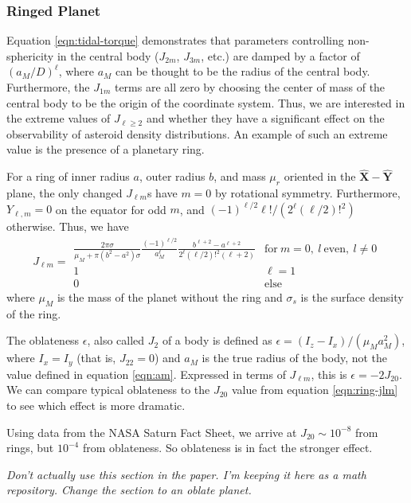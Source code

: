 \documentclass[linenumbers]{aastex631}
\newcommand{\unit}[1]{\hat{\mathbf{#1}}}
\newcommand{\jtd}[1]{{\color{red}\textit{#1}}}
\begin{document}
\subsubsection{Ringed Planet}
Equation \ref{eqn:tidal-torque} demonstrates that parameters controlling non-sphericity in the central body ($J_{2m}$, $J_{3m}$, etc.) are damped by a factor of $(a_M/D)^\ell$, where $a_M$ can be thought to be the radius of the central body. Furthermore, the $J_{1m}$ terms are all zero by choosing the center of mass of the central body to be the origin of the coordinate system. Thus, we are interested in the extreme values of $J_{\ell \geq 2}$ and whether they have a significant effect on the observability of asteroid density distributions. An example of such an extreme value is the presence of a planetary ring.

For a ring of inner radius $a$, outer radius $b$, and mass $\mu_r$ oriented in the $\unit X-\unit Y$ plane, the only changed $J_{\ell m}$s have $m = 0$ by rotational symmetry. Furthermore, $Y_{\ell, m} = 0$ on the equator for odd $m$, and $(-1)^{\ell/2} \ell! / (2^\ell (\ell/2)!^2)$ otherwise. Thus, we have
\begin{equation}
J_{\ell m} = \begin{array}{cc}
\frac{2 \pi \sigma}{\mu_M + \pi(b^2-a^2)\sigma}\frac{(-1)^{\ell/2}}{a_M^\ell}\frac{b^{\ell+2} - a^{\ell+2}}{2^\ell (\ell/2)!^2 (\ell + 2)}
 & \text{for}\ m = 0,\ l\ \text{even},\ l \neq 0\\
1 & \ell = 1\\
0 & \text{else}
\end{array}
\label{eqn:ring-jlm}
\end{equation}
where $\mu_M$ is the mass of the planet without the ring and $\sigma_s$ is the surface density of the ring.


The oblateness $\epsilon$, also called $J_2$ of a body is defined as $\epsilon = (I_z - I_x)/(\mu_M a_M^2)$, where $I_x = I_y$ (that is, $J_{22} = 0$) and $a_M$ is the true radius of the body, not the value defined in equation \ref{eqn:am}. Expressed in terms of $J_{\ell m}$, this is $\epsilon = -2J_{20}$. We can compare typical oblateness to the $J_{20}$ value from equation \ref{eqn:ring-jlm} to see which effect is more dramatic.

Using data from the NASA Saturn Fact Sheet, we arrive at $J_{20}\sim 10^{-8}$ from rings, but $10^{-4}$ from oblateness. So oblateness is in fact the stronger effect.

\jtd{Don't actually use this section in the paper. I'm keeping it here as a math repository. Change the section to an oblate planet.}
\end{document}
